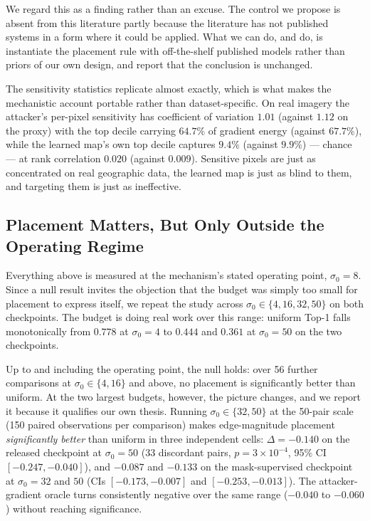 \documentclass[10pt,journal]{IEEEtran}
\begin{document}
We regard this as a finding rather than an excuse. The control we propose is
absent from this literature partly because the literature has not published
systems in a form where it could be applied. What we can do, and do, is
instantiate the placement rule with off-the-shelf published models rather than
priors of our own design, and report that the conclusion is unchanged.

The sensitivity statistics replicate almost exactly, which is what makes the
mechanistic account portable rather than dataset-specific. On real imagery the
attacker's per-pixel sensitivity has coefficient of variation $1.01$ (against
$1.12$ on the proxy) with the top decile carrying $64.7\%$ of gradient energy
(against $67.7\%$), while the learned map's own top decile captures $9.4\%$
(against $9.9\%$) --- chance --- at rank correlation $0.020$ (against
$0.009$). Sensitive pixels are just as concentrated on real geographic data,
the learned map is just as blind to them, and targeting them is just as
ineffective.

\subsection{Placement Matters, But Only Outside the Operating
Regime}
\label{sec:budget}

Everything above is measured at the mechanism's stated operating point,
$\sigma_0=8$. Since a null result invites the objection that the budget was
simply too small for placement to express itself, we repeat the study across
$\sigma_0 \in \{4, 16, 32, 50\}$ on both checkpoints. The budget is doing real
work over this range: uniform Top-1 falls monotonically from $0.778$ at
$\sigma_0=4$ to $0.444$ and $0.361$ at $\sigma_0=50$ on the two checkpoints.

Up to and including the operating point, the null holds: over 56 further
comparisons at $\sigma_0 \in \{4, 16\}$ and above, no placement is
significantly better than uniform. At the two largest budgets, however, the
picture changes, and we report it because it qualifies our own thesis. Running
$\sigma_0 \in \{32, 50\}$ at the 50-pair scale (150 paired observations per
comparison) makes edge-magnitude placement \emph{significantly better} than
uniform in three independent cells: $\Delta=-0.140$ on the released
checkpoint at $\sigma_0=50$ (33 discordant pairs, $p=3\times10^{-4}$, 95\% CI
$[-0.247,-0.040]$), and $-0.087$ and $-0.133$ on the mask-supervised
checkpoint at $\sigma_0=32$ and $50$ (CIs $[-0.173,-0.007]$ and
$[-0.253,-0.013]$). The attacker-gradient oracle turns consistently negative
over the same range ($-0.040$ to $-0.060$) without reaching significance.
\end{document}
